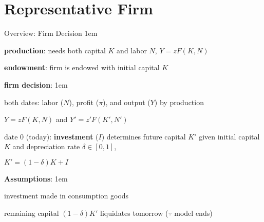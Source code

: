 \documentclass[11pt,aspectratio=43]{beamer}
\let\olditemize=\itemize
\let\endolditemize=\enditemize
\renewenvironment{itemize}{\olditemize \itemsep1em}{\endolditemize}
\let\oldenumerate=\enumerate
\let\endoldenumerate=\endenumerate
\renewenvironment{enumerate}{\oldenumerate \itemsep1em}{ \endoldenumerate}
\theoremstyle{definition}
\begin{document}
\section{Representative Firm}
\label{sec:Representative_Firm}

\begin{frame}{Overview: Firm Decision}
\label{slide:Overview__Firm_Decision}
    \begin{itemize}
        \item \textbf{production}: needs both capital $ K $ and labor $ N $, $ Y = zF( K, N ) $
        \item \textbf{endowment}: firm is endowed with initial capital $ K $
        \item \textbf{firm decision}:
        \begin{itemize}
            \item \alert{both dates}: labor ($N$), profit ($\pi$), and output ($Y$) by production
            \begin{center}
                $ \displaystyle Y = z F( K, N ) $ and $ \displaystyle Y' = z' F( K', N' ) $
            \end{center}
            \item \alert{date 0} (today): \textbf{investment} ($I$) determines future capital $ K' $ given initial capital $ K $ and \alert{depreciation rate $ \delta \in [ 0, 1 ] $},
            \begin{center}
                $ \displaystyle K' = ( 1-\delta ) K + I $
            \end{center}
        \end{itemize}
        \item \textbf{Assumptions}:
        \begin{enumerate}
            \item investment made in consumption goods
            \item remaining capital $ ( 1-\delta )K' $ liquidates tomorrow ($\because$ model ends)
        \end{enumerate}
    \end{itemize}
\end{frame}
\end{document}
